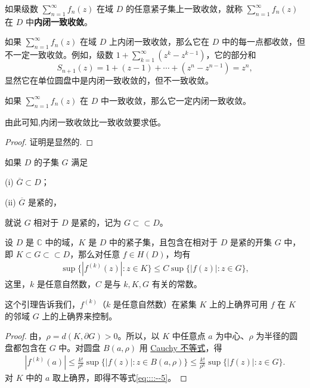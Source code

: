 \documentclass[../../main.tex]{subfiles}
\begin{document}
\begin{definition}
如果级数 \( \sum_{n=1}^{\infty} f_n(z) \) 在域 \( D \) 的任意紧子集上一致收敛，就称 \( \sum_{n=1}^{\infty} f_n(z) \) 在 \( D \) 中\textbf{内闭一致收敛}。
\end{definition}

\begin{remark}
如果 \( \sum_{n=1}^{\infty} f_n(z) \) 在域 \( D \) 上内闭一致收敛，那么它在 \( D \) 中的每一点都收敛，但不一定一致收敛。例如，级数 \( 1 + \sum_{k=1}^{\infty} (z^k - z^{k - 1}) \)，它的部分和
\[
S_{n + 1}(z) = 1 + (z - 1) + \cdots + (z^n - z^{n - 1}) = z^n,
\]
显然它在单位圆盘中是内闭一致收敛的，但不一致收敛。
\end{remark}

\begin{proposition}
如果 \( \sum_{n=1}^{\infty} f_n(z) \) 在 \( D \) 中一致收敛，那么它一定内闭一致收敛。
\end{proposition}
\begin{note}
由此可知,内闭一致收敛比一致收敛要求低。
\end{note}
\begin{proof}
证明是显然的.

\end{proof}

\begin{definition}
如果 \( D \) 的子集 \( G \) 满足

(i) \( \overline{G} \subset D \)；

(ii) \( \overline{G} \) 是紧的，

就说 \( G \) 相对于 \( D \) 是紧的，记为 \( G \subset\subset D \)。
\end{definition}

\begin{lemma}\label{lemma:引理4.1.8}
设 \( D \) 是 \( \mathbb{C} \) 中的域，\( K \) 是 \( D \) 中的紧子集，且包含在相对于 \( D \) 是紧的开集 \( G \) 中，即 \( K \subset G \subset\subset D \)，那么对任意 \( f \in H(D) \)，均有
\begin{align}
\sup\{|f^{(k)}(z)| : z \in K\} \leqslant C\sup\{|f(z)| : z \in G\},\label{eq::::--5}
\end{align}
这里，\( k \) 是任意自然数，\( C \) 是与 \( k, K, G \) 有关的常数。
\end{lemma}
\begin{note}
这个引理告诉我们，\( f^{(k)} \)（\( k \) 是任意自然数）在紧集 \( K \) 上的上确界可用 \( f \) 在 \( K \) 的邻域 \( G \) 上的上确界来控制。
\end{note}
\begin{proof}
由，\( \rho = d(K, \partial G) > 0 \)。所以，以 \( K \) 中任意点 \( a \) 为中心、\( \rho \) 为半径的圆盘都包含在 \( G \) 中。对圆盘 \( B(a, \rho) \) 用 \hyperref[theorem:Cauchy不等式-复变函数]{Cauchy 不等式}，得
\begin{align*}
|f^{(k)}(a)| \leqslant \frac{k!}{\rho^k}\sup\{|f(z)| : z \in B(a, \rho)\} \leqslant \frac{k!}{\rho^k}\sup\{|f(z)| : z \in G\}.
\end{align*}
对 \( K \) 中的 \( a \) 取上确界，即得不等式\eqref{eq::::--5}。

\end{proof}
\end{document}
